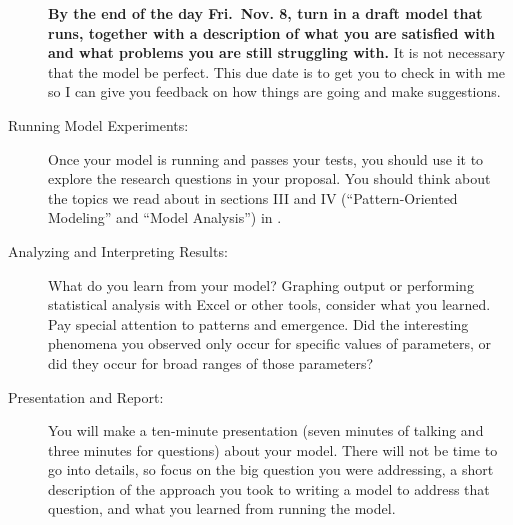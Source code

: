 \documentclass{jghandout}
\begin{document}
\begin{description}
    \textbf{By the end of the day Fri.\ Nov. 8, turn in a draft model that
    runs, together with a description of what you are satisfied with and what
    problems you are still struggling with.}
    It is not necessary that the model be perfect. This due date is to get you
    to check in with me so I can give you feedback on how things are going and
    make suggestions.

    \item[Running Model Experiments:] Once your model is running and passes your
    tests, you should use it to explore the research questions in your proposal.
    You should think about the topics we read about in sections III and IV
    (``Pattern-Oriented Modeling'' and ``Model Analysis'') in
    \emph{\MedRailsback}.

    \item[Analyzing and Interpreting Results:] What do you learn from your
    model? Graphing output or performing statistical analysis with Excel or
    other tools, consider what you learned. Pay special attention to patterns
    and emergence. Did the interesting phenomena you observed only occur for
    specific values of parameters, or did they occur for broad ranges of those
    parameters?
    \item[Presentation and Report:] You will make a ten-minute presentation
    (seven minutes of talking and three minutes for questions) about your
    model. There will not be time to go into details, so focus on the big
    question you were addressing, a short description of the approach you
    took to writing a model to address that question, and what you learned
    from running the model.


\end{description}
\end{document}
